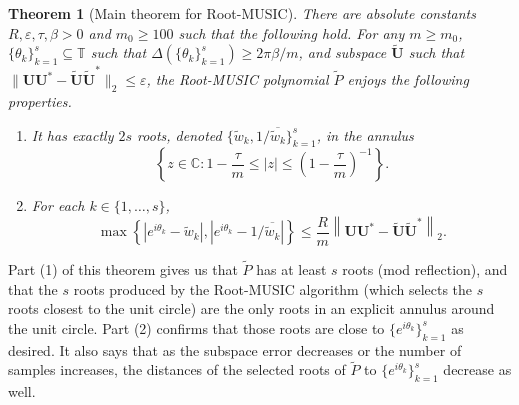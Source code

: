 \documentclass[11pt]{article}
\newtheorem{theorem}{Theorem}
\theoremstyle{definition}
\numberwithin{theorem}{section}
\numberwithin{equation}{section}
\def\C{\mathbb{C}}
\def\T{\mathbb{T}}
\renewcommand{\subset}{\subseteq}
\renewcommand{\tilde}{\widetilde}
\renewcommand{\epsilon}{\varepsilon}
\newcommand{\bfU}{{\boldsymbol U}}
\newcommand{\noteW}[1]{\textcolor{purple}{{\textbf{Weilin:} #1}}}
\numberwithin{equation}{section}
\begin{document}
\begin{theorem}[Main theorem for Root-MUSIC] \label{thm:step2}
    There are absolute constants $R,\epsilon,\tau,\beta>0$ and $m_0\geq 100$ such that the following hold. For any $m\geq m_0$, $\{\theta_k\}_{k=1}^s\subset\T$ such that $\Delta(\{\theta_k\}_{k=1}^s)\geq 2\pi\beta/m$, and subspace $\tilde\bfU$ such that $\|\bfU \bfU^* -\tilde\bfU \tilde \bfU^*\|_2 \leq \epsilon$, the Root-MUSIC polynomial $\tilde P$ enjoys the following properties. 
    \begin{enumerate}
        \item 
        It has exactly $2s$ roots, denoted $\{\tilde w_k, 1/\overline{\tilde w_k}\}_{k=1}^s$, in the annulus
        $$
        \left\{z\in\C\colon 1-\frac \tau m \leq |z|\leq \left( 1- \frac \tau m\right)^{-1} \right\}.
        $$
        \item 
        For each $k\in \{1,\dots,s\}$, 
        \begin{equation}
    		\max\left\{ \left| e^{i\theta_k} -\tilde w_k \right|, \left| e^{i\theta_k} - 1/\overline{\tilde w_k}\right| \right\}\leq \frac {R}{m}\left\|\bfU\bfU^*- \tilde \bfU \tilde\bfU^* \right\|_2.  \label{eq:mainformal}
    	\end{equation}
    \end{enumerate}
\end{theorem}

Part (1) of this theorem gives us that $\tilde P$ has at least $s$ roots (mod reflection), and that the $s$ roots produced by the Root-MUSIC algorithm (which selects the $s$ roots closest to the unit circle) are the only roots in an explicit annulus around the unit circle. %
Part (2) confirms that those roots are close to $\{e^{i\theta_k}\}_{k=1}^s$ as desired. It also says that as the subspace error decreases or the number of samples increases, the distances of the selected roots of $\tilde P$ to $\{e^{i\theta_k}\}_{k=1}^s$ decrease as well. 
\end{document}
